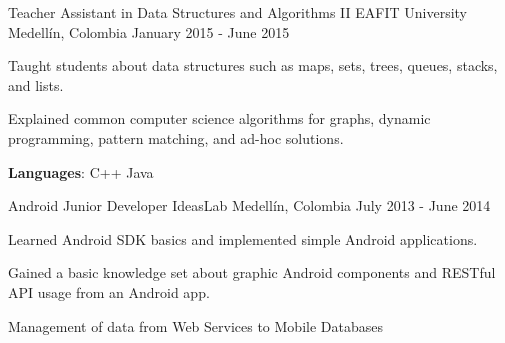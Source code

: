\begin{cventries}
{\begin{cvsubentries}
      \end{cvsubentries}
    }
  \cventry
    {Teacher Assistant in Data Structures and Algorithms II}
    {EAFIT University}
    {Medellín, Colombia}
    {January 2015 - June 2015}
    {
      \begin{cvitems}
        \item {Taught students about data structures such as maps, sets, trees, queues, stacks, and lists.}
        \item {Explained common computer science algorithms for graphs, dynamic programming, pattern matching, and ad-hoc solutions.}
        \item {\textbf{Languages}: C++ {\dotsep}  {\dotsep} Java {\dotsep} }
      \end{cvitems}
    }
  \cventry
    {Android Junior Developer}
    {IdeasLab}
    {Medellín, Colombia}
    {July 2013 - June 2014}
    {
      \begin{cvitems}
        \item {Learned Android SDK basics and implemented simple Android applications.}
        \item {Gained a basic knowledge set about graphic Android components and RESTful API usage from an Android app.}
        \item {Management of data from Web Services to Mobile Databases}
      \end{cvitems}
    }
\end{cventries}
